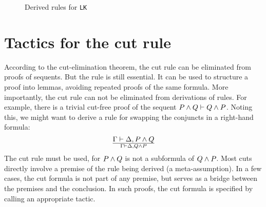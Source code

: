 \begin{figure} 

\caption{Derived rules for {\tt LK}} \label{lk-derived}
\end{figure}


\section{Tactics for the cut rule}
According to the cut-elimination theorem, the cut rule can be eliminated
from proofs of sequents.  But the rule is still essential.  It can be used
to structure a proof into lemmas, avoiding repeated proofs of the same
formula.  More importantly, the cut rule can not be eliminated from
derivations of rules.  For example, there is a trivial cut-free proof of
the sequent \(P\wedge Q\vdash Q\wedge P\).
Noting this, we might want to derive a rule for swapping the conjuncts
in a right-hand formula:
\[ \Gamma\vdash \Delta, P\wedge Q\over \Gamma\vdash \Delta, Q\wedge P \]
The cut rule must be used, for $P\wedge Q$ is not a subformula of $Q\wedge
P$.  Most cuts directly involve a premise of the rule being derived (a
meta-assumption).  In a few cases, the cut formula is not part of any
premise, but serves as a bridge between the premises and the conclusion.
In such proofs, the cut formula is specified by calling an appropriate
tactic.

